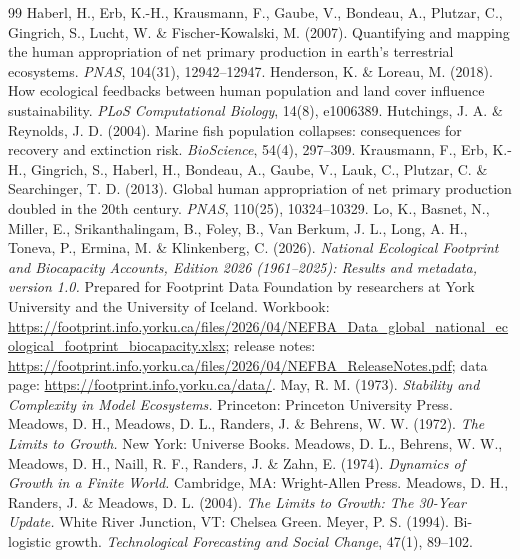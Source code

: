 \documentclass[preprint,12pt,authoryear]{elsarticle}
\begin{document}
\begin{thebibliography}{99}
 Haberl, H., Erb, K.-H., Krausmann, F., Gaube, V., Bondeau, A., Plutzar, C., Gingrich, S., Lucht, W. \& Fischer-Kowalski, M. (2007). Quantifying and mapping the human appropriation of net primary production in earth's terrestrial ecosystems. \emph{PNAS}, 104(31), 12942--12947.
 Henderson, K. \& Loreau, M. (2018). How ecological feedbacks between human population and land cover influence sustainability. \emph{PLoS Computational Biology}, 14(8), e1006389.
 Hutchings, J. A. \& Reynolds, J. D. (2004). Marine fish population collapses: consequences for recovery and extinction risk. \emph{BioScience}, 54(4), 297--309.
 Krausmann, F., Erb, K.-H., Gingrich, S., Haberl, H., Bondeau, A., Gaube, V., Lauk, C., Plutzar, C. \& Searchinger, T. D. (2013). Global human appropriation of net primary production doubled in the 20th century. \emph{PNAS}, 110(25), 10324--10329.
 Lo, K., Basnet, N., Miller, E., Srikanthalingam, B., Foley, B., Van Berkum, J. L., Long, A. H., Toneva, P., Ermina, M. \& Klinkenberg, C. (2026). \emph{National Ecological Footprint and Biocapacity Accounts, Edition 2026 (1961--2025): Results and metadata, version 1.0.} Prepared for Footprint Data Foundation by researchers at York University and the University of Iceland. Workbook: \url{https://footprint.info.yorku.ca/files/2026/04/NEFBA_Data_global_national_ecological_footprint_biocapacity.xlsx}; release notes: \url{https://footprint.info.yorku.ca/files/2026/04/NEFBA_ReleaseNotes.pdf}; data page: \url{https://footprint.info.yorku.ca/data/}.
 May, R. M. (1973). \emph{Stability and Complexity in Model Ecosystems.} Princeton: Princeton University Press.
 Meadows, D. H., Meadows, D. L., Randers, J. \& Behrens, W. W. (1972). \emph{The Limits to Growth.} New York: Universe Books.
 Meadows, D. L., Behrens, W. W., Meadows, D. H., Naill, R. F., Randers, J. \& Zahn, E. (1974). \emph{Dynamics of Growth in a Finite World.} Cambridge, MA: Wright-Allen Press.
 Meadows, D. H., Randers, J. \& Meadows, D. L. (2004). \emph{The Limits to Growth: The 30-Year Update.} White River Junction, VT: Chelsea Green.
 Meyer, P. S. (1994). Bi-logistic growth. \emph{Technological Forecasting and Social Change}, 47(1), 89--102.

\end{thebibliography}
\end{document}
